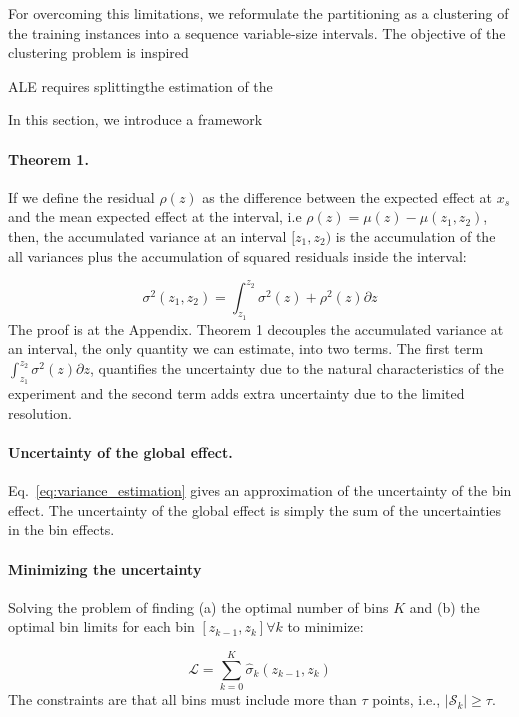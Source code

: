 \documentclass[twoside]{article}
\begin{document}
For overcoming this limitations, we reformulate the partitioning as a
clustering of the training instances into a sequence variable-size
intervals. The objective of the clustering problem is inspired 


ALE requires splittingthe estimation of the 

In this section, we introduce a framework 

\paragraph{Theorem 1.} If we define the residual \(\rho(z)\) as the
difference between the expected effect at \(x_s\) and the mean
expected effect at the interval, i.e
\(\rho(z) = \mu(z) - \mu(z_1, z_2)\), then, the accumulated variance
at an interval \([z_1, z_2)\) is the accumulation of the all variances
plus the accumulation of squared residuals inside the interval:

\begin{equation}
 \sigma^2(z_1, z_2) = \int_{z_1}^{z_2} \sigma^2(z) + \rho^2(z) \partial z
\end{equation}
%
The proof is at the Appendix. Theorem 1 decouples the accumulated
variance at an interval, the only quantity we can estimate, into two
terms. The first term \(\int_{z_1}^{z_2} \sigma^2(z) \partial z\),
quantifies the uncertainty due to the natural characteristics of the
experiment and the second term adds extra uncertainty due to the
limited resolution.



\paragraph{Uncertainty of the global effect.}

Eq.~\eqref{eq:variance_estimation} gives an approximation of the
uncertainty of the bin effect.
The uncertainty of the global effect is
simply the sum of the uncertainties in the bin effects.

\paragraph{Minimizing the uncertainty}

Solving the problem of finding (a) the optimal number of bins \(K\) and (b) the optimal bin limits for each bin \([z_{k-1}, z_k] \forall k\) to minimize:

\begin{equation}
  \label{eq:1}
  \mathcal{L} = \sum_{k=0}^K \hat{\sigma}_k(z_{k-1}, z_k)
\end{equation}
%
The constraints are that all bins must include more than \(\tau\)
points, i.e., \(|\mathcal{S}_k| \geq \tau\).
\end{document}
